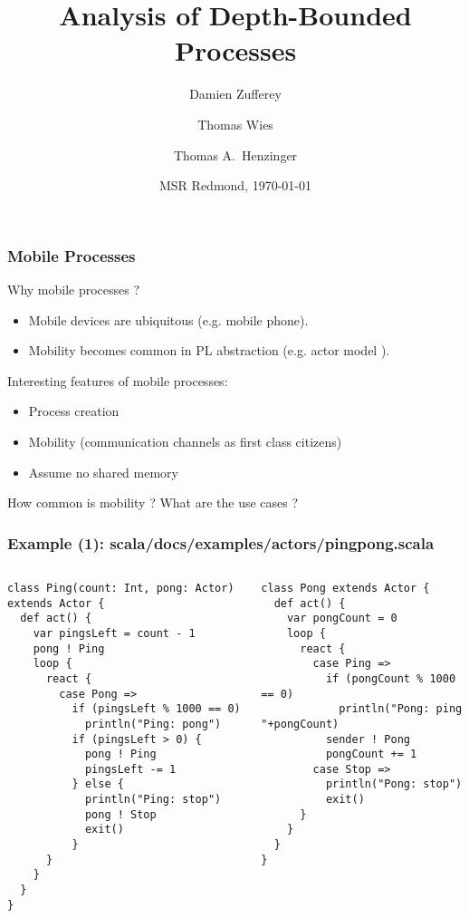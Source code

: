 \documentclass{beamer}
\title[Analysis of DBP]{Analysis of Depth-Bounded Processes}
\author{Damien Zufferey\inst{1} \and Thomas Wies\inst{2} \and Thomas A.\ Henzinger\inst{1}}
\institute{\inst{1} IST Austria \and \inst{2} New York University}
\date{MSR Redmond, \today}
\begin{document}
\frame[plain]{\titlepage}

\begin{frame}
  \frametitle{Mobile Processes}

  Why mobile processes ?
  \begin{itemize}
  \item Mobile devices are ubiquitous (e.g. mobile phone).
  \item Mobility becomes common in PL abstraction (e.g. actor model \cite{DBLP:conf/ijcai/HewittBS73}).
  \end{itemize}

  \vspace{10pt}

  Interesting features of mobile processes:
  \begin{itemize}
  \item Process creation
  \item Mobility (communication channels as first class citizens)
  \item Assume no shared memory
  \end{itemize}

  \vspace{10pt}

  How common is mobility ? What are the use cases ?

\end{frame}


\begin{frame}[fragile]
  \frametitle{Example (1): scala/docs/examples/actors/pingpong.scala}

  \begin{columns}
    \column{6cm}
{\tiny
\begin{verbatim}
class Ping(count: Int, pong: Actor) extends Actor {
  def act() {
    var pingsLeft = count - 1
    pong ! Ping
    loop {
      react {
        case Pong =>
          if (pingsLeft % 1000 == 0)
            println("Ping: pong")
          if (pingsLeft > 0) {
            pong ! Ping
            pingsLeft -= 1
          } else {
            println("Ping: stop")
            pong ! Stop
            exit()
          }
      }
    }
  }
}
\end{verbatim}
}

    \column{5cm}
{\tiny
\begin{verbatim}
class Pong extends Actor {
  def act() {
    var pongCount = 0
    loop {
      react {
        case Ping =>
          if (pongCount % 1000 == 0)
            println("Pong: ping "+pongCount)
          sender ! Pong
          pongCount += 1
        case Stop =>
          println("Pong: stop")
          exit()
      }
    }
  }
}
\end{verbatim}
}
  \end{columns}
\end{frame}
\end{document}
